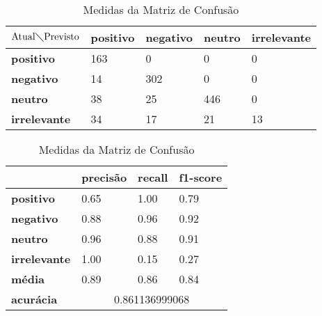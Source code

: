 \begin{table}[h!]
\centering
\begin{minipage}[b]{0.45\linewidth}
\caption{Matriz de Confusão Quaternário: \textit{Random Forest}}
\label{tab:mcb-nb}
\begin{tabular}{|l|l|l|l|l|}
\hline
$\textrm{Atual}\diagdown\textrm{Previsto}$ & \textbf{positivo} & \textbf{negativo} & \textbf{neutro} & \textbf{irrelevante}\\ \hline
\textbf{positivo} & 163 & 0 & 0 & 0\\ \hline
\textbf{negativo} & 14 & 302 & 0 & 0\\ \hline
\textbf{neutro} & 38 & 25 & 446 & 0\\ \hline
\textbf{irrelevante} & 34 & 17 & 21 & 13\\ \hline
\end{tabular}
\end{minipage}
\hspace{0.5cm}
\begin{minipage}[b]{0.45\linewidth}

\centering
\caption{Medidas da Matriz de Confusão}
\label{tab:mmcb-nb}
\begin{tabular}{|l|l|l|l|}
\hline
         & \textbf{precisão} & \textbf{recall} & \textbf{f1-score} \\ \hline
\textbf{positivo} & 0.65     & 1.00   & 0.79     \\ \hline
\textbf{negativo} & 0.88     & 0.96   & 0.92     \\ \hline
\textbf{neutro} & 0.96     & 0.88   & 0.91     \\ \hline
\textbf{irrelevante} & 1.00     & 0.15   & 0.27     \\ \hline
\textbf{média} & 0.89     & 0.86   & 0.84     \\ \hline
\textbf{acurácia} & \multicolumn{3}{|c|}{0.861136999068}\\ \hline
\end{tabular}
\end{minipage}
\end{table}